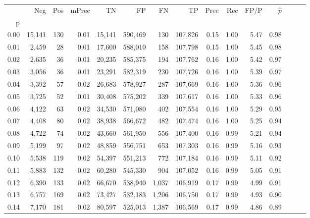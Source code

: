 \begin{tabular}{rrrrrrrrrrrrrrr}
\toprule
{} &     Neg &    Pos & mPrec &       TN &       FP &       FN &       TP &  Prec &   Rec &  FP/P & $\hat{p}$ \\
p    &         &        &       &          &          &          &          &       &       &       &           \\
\midrule
0.00 &  15,141 &    130 &  0.01 &   15,141 &  590,469 &      130 &  107,826 &  0.15 &  1.00 &  5.47 &      0.98 \\
0.01 &   2,459 &     28 &  0.01 &   17,600 &  588,010 &      158 &  107,798 &  0.15 &  1.00 &  5.45 &      0.98 \\
0.02 &   2,635 &     36 &  0.01 &   20,235 &  585,375 &      194 &  107,762 &  0.16 &  1.00 &  5.42 &      0.97 \\
0.03 &   3,056 &     36 &  0.01 &   23,291 &  582,319 &      230 &  107,726 &  0.16 &  1.00 &  5.39 &      0.97 \\
0.04 &   3,392 &     57 &  0.02 &   26,683 &  578,927 &      287 &  107,669 &  0.16 &  1.00 &  5.36 &      0.96 \\
0.05 &   3,725 &     52 &  0.01 &   30,408 &  575,202 &      339 &  107,617 &  0.16 &  1.00 &  5.33 &      0.96 \\
0.06 &   4,122 &     63 &  0.02 &   34,530 &  571,080 &      402 &  107,554 &  0.16 &  1.00 &  5.29 &      0.95 \\
0.07 &   4,408 &     80 &  0.02 &   38,938 &  566,672 &      482 &  107,474 &  0.16 &  1.00 &  5.25 &      0.94 \\
0.08 &   4,722 &     74 &  0.02 &   43,660 &  561,950 &      556 &  107,400 &  0.16 &  0.99 &  5.21 &      0.94 \\
0.09 &   5,199 &     97 &  0.02 &   48,859 &  556,751 &      653 &  107,303 &  0.16 &  0.99 &  5.16 &      0.93 \\
0.10 &   5,538 &    119 &  0.02 &   54,397 &  551,213 &      772 &  107,184 &  0.16 &  0.99 &  5.11 &      0.92 \\
0.11 &   5,883 &    132 &  0.02 &   60,280 &  545,330 &      904 &  107,052 &  0.16 &  0.99 &  5.05 &      0.91 \\
0.12 &   6,390 &    133 &  0.02 &   66,670 &  538,940 &    1,037 &  106,919 &  0.17 &  0.99 &  4.99 &      0.91 \\
0.13 &   6,757 &    169 &  0.02 &   73,427 &  532,183 &    1,206 &  106,750 &  0.17 &  0.99 &  4.93 &      0.90 \\
0.14 &   7,170 &    181 &  0.02 &   80,597 &  525,013 &    1,387 &  106,569 &  0.17 &  0.99 &  4.86 &      0.89 \\

\end{tabular}

